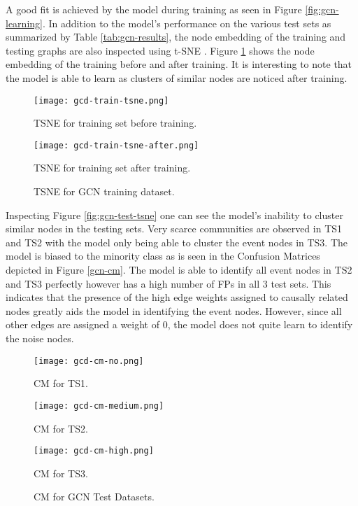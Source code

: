 A good fit is achieved by the model during training as seen in Figure
\ref{fig:gcn-learning}. In addition to the model's performance on the
various test sets as summarized by Table \ref{tab:gcn-results}, the
node embedding of the training and testing graphs are also inspected
using t-SNE \cite{maaten2008visualizing}. Figure
\ref{fig:gcn-train-tsne} shows the node embedding of the training
before and after training. It is interesting to note that the model is
able to learn as clusters of similar nodes are noticed after training.

\begin{figure}[htb]
  \centering
  \begin{minipage}{0.49\textwidth}
    \centering
    \texttt{[image: gcd-train-tsne.png]}
    \caption{TSNE for training set before training.}
  \end{minipage}
  \begin{minipage}{0.49\textwidth}
    \centering
    \texttt{[image: gcd-train-tsne-after.png]}
    \caption{TSNE for training set after training.}
  \end{minipage}
  \caption{TSNE for GCN training dataset.}
  \label{fig:gcn-train-tsne}
\end{figure}

Inspecting Figure \ref{fig:gcn-test-tsne} one can see the model's
inability to cluster similar nodes in the testing sets. Very scarce
communities are observed in TS1 and TS2 with the model only being able
to cluster the event nodes in TS3. The model is biased to the minority
class as is seen in the Confusion Matrices depicted in Figure
\ref{gcn-cm}. The model is able to identify all event nodes in TS2 and
TS3 perfectly however has a high number of FPs in all 3 test sets.
This indicates that the presence of the high edge weights assigned to
causally related nodes greatly aids the model in identifying the event
nodes. However, since all other edges are assigned a weight of 0, the
model does not quite learn to identify the noise nodes.

\begin{figure}[htb]
  \centering
  \begin{minipage}{0.32\textwidth}
    \centering
    \texttt{[image: gcd-cm-no.png]}
    \caption{CM for TS1.}
  \end{minipage}
  \begin{minipage}{0.32\textwidth}
    \centering
    \texttt{[image: gcd-cm-medium.png]}
    \caption{CM for TS2.}
  \end{minipage}
  \begin{minipage}{0.32\textwidth}
    \centering
    \texttt{[image: gcd-cm-high.png]}
    \caption{CM for TS3.}
  \end{minipage}
  \caption{CM for GCN Test Datasets.}
  \label{fig:gcn-cm}
\end{figure}

